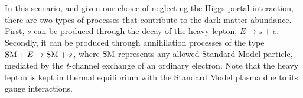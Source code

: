 \documentclass[a4paper,11pt]{article}
\begin{document}
In this scenario, and given our choice of neglecting the Higgs portal interaction, there are two types of processes that contribute to the dark matter abundance. First, $s$ can be produced through the decay of the heavy lepton, $E \rightarrow s + e$. Secondly, it can be produced through annihilation processes of the type ${\rm SM} + E \rightarrow {\rm SM} + s$, where ${\rm SM}$ represents any allowed Standard Model particle, mediated by the $t$-channel exchange of an ordinary electron. Note that the heavy lepton is kept in thermal equilibrium with the Standard Model plasma due to its gauge interactions.


\providecommand{\href}[2]{#2}\begingroup\raggedright\begin{thebibliography}{10}



\end{thebibliography}\endgroup
\end{document}
